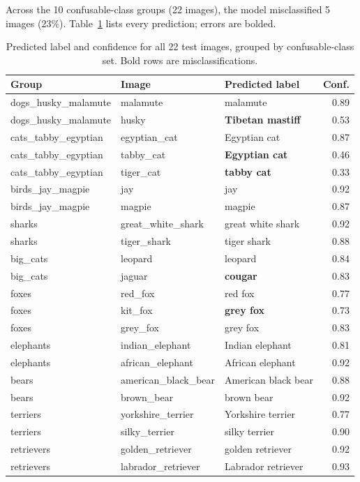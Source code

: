 Across the 10 confusable-class groups (22 images), the model misclassified
5 images (23\%). Table~\ref{tab:predictions} lists every prediction; errors
are bolded.

\begin{table}[h]
\centering
\small
\begin{tabular}{lllr}
\toprule
Group & Image & Predicted label & Conf. \\
\midrule
dogs\_husky\_malamute & malamute & malamute & 0.89 \\
dogs\_husky\_malamute & husky & \textbf{Tibetan mastiff} & 0.53 \\
cats\_tabby\_egyptian & egyptian\_cat & Egyptian cat & 0.87 \\
cats\_tabby\_egyptian & tabby\_cat & \textbf{Egyptian cat} & 0.46 \\
cats\_tabby\_egyptian & tiger\_cat & \textbf{tabby cat} & 0.33 \\
birds\_jay\_magpie & jay & jay & 0.92 \\
birds\_jay\_magpie & magpie & magpie & 0.87 \\
sharks & great\_white\_shark & great white shark & 0.92 \\
sharks & tiger\_shark & tiger shark & 0.88 \\
big\_cats & leopard & leopard & 0.84 \\
big\_cats & jaguar & \textbf{cougar} & 0.83 \\
foxes & red\_fox & red fox & 0.77 \\
foxes & kit\_fox & \textbf{grey fox} & 0.73 \\
foxes & grey\_fox & grey fox & 0.83 \\
elephants & indian\_elephant & Indian elephant & 0.81 \\
elephants & african\_elephant & African elephant & 0.92 \\
bears & american\_black\_bear & American black bear & 0.88 \\
bears & brown\_bear & brown bear & 0.92 \\
terriers & yorkshire\_terrier & Yorkshire terrier & 0.77 \\
terriers & silky\_terrier & silky terrier & 0.90 \\
retrievers & golden\_retriever & golden retriever & 0.92 \\
retrievers & labrador\_retriever & Labrador retriever & 0.93 \\
\bottomrule
\end{tabular}
\caption{Predicted label and confidence for all 22 test images, grouped by
confusable-class set. Bold rows are misclassifications.}
\label{tab:predictions}
\end{table}

